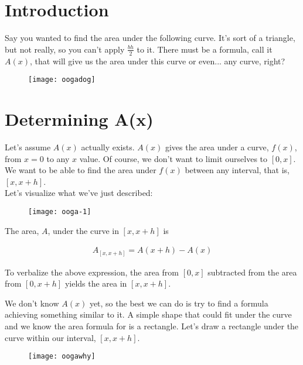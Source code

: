 \documentclass{article}
\begin{document}
 
\section{Introduction}

Say you wanted to find the area under the following curve. It's sort of a triangle, but not really, so you can't apply $\frac{bh}{2}$ to it. There must be a formula, call it $A(x)$, that will give us the area under this curve or even... any curve, right?

\begin{figure}[htbp!]
\centering
\texttt{[image: oogadog]}
\end{figure}
\noindent

\newpage
\section{Determining A(x)}

\noindent
Let's assume $A(x)$ actually exists. $A(x)$ gives the area under a curve, $f(x)$, from $x=0$ to any $x$ value. Of course, we don't want to limit ourselves to $[0,x]$. We want to be able to find the area under $f(x)$ between any interval, that is, $[x,x+h]$. \\

\noindent
Let's visualize what we've just described:

\begin{figure}[htbp!]
\centering
\texttt{[image: ooga-1]}
\end{figure}

\noindent
The area, $A$, under the curve in $[x,x+h]$ is

\begin{align}
A_{[x,x+h]} = A(x+h)-A(x)
\end{align}

\noindent
To verbalize the above expression, the area from $[0,x]$ subtracted from the area from $[0,x+h]$ yields the area in $[x,x+h]$. 

\newpage
\noindent
We don't know $A(x)$ yet, so the best we can do is try to find a formula achieving something similar to it. A simple shape that could fit under the curve and we know the area formula for is a rectangle. Let's draw a rectangle under the curve within our interval, $[x,x+h]$.

\begin{figure}[htbp!]
\centering
\texttt{[image: oogawhy]}
\end{figure}
\end{document}
